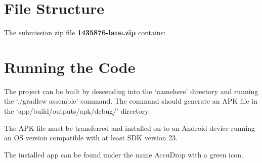\appendix
\section{File Structure}\label{sec:file-structure}
The submission zip file \textbf{1435876-lane.zip} contains:


\section{Running the Code}\label{sec:running-the-code}
The project can be built by descending into the `namehere' directory and running the `./gradlew assemble' command. The command should generate an APK file in the `app/build/outputs/apk/debug/' directory.

The APK file must be transferred and installed on to an Android device running an OS version compatible with at least SDK version 23.

The installed app can be found under the name AccuDrop with a green icon.
